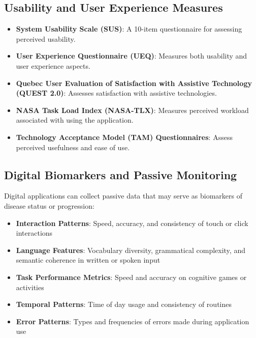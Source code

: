 \subsection{Usability and User Experience Measures}
\begin{itemize}
    \item \textbf{System Usability Scale (SUS)}: A 10-item questionnaire for assessing perceived usability.
    
    \item \textbf{User Experience Questionnaire (UEQ)}: Measures both usability and user experience aspects.
    
    \item \textbf{Quebec User Evaluation of Satisfaction with Assistive Technology (QUEST 2.0)}: Assesses satisfaction with assistive technologies.
    
    \item \textbf{NASA Task Load Index (NASA-TLX)}: Measures perceived workload associated with using the application.
    
    \item \textbf{Technology Acceptance Model (TAM) Questionnaires}: Assess perceived usefulness and ease of use.
\end{itemize}

\subsection{Digital Biomarkers and Passive Monitoring}
Digital applications can collect passive data that may serve as biomarkers of disease status or progression:

\begin{itemize}
    \item \textbf{Interaction Patterns}: Speed, accuracy, and consistency of touch or click interactions
    
    \item \textbf{Language Features}: Vocabulary diversity, grammatical complexity, and semantic coherence in written or spoken input
    
    \item \textbf{Task Performance Metrics}: Speed and accuracy on cognitive games or activities
    
    \item \textbf{Temporal Patterns}: Time of day usage and consistency of routines
    
    \item \textbf{Error Patterns}: Types and frequencies of errors made during application use
\end{itemize}

